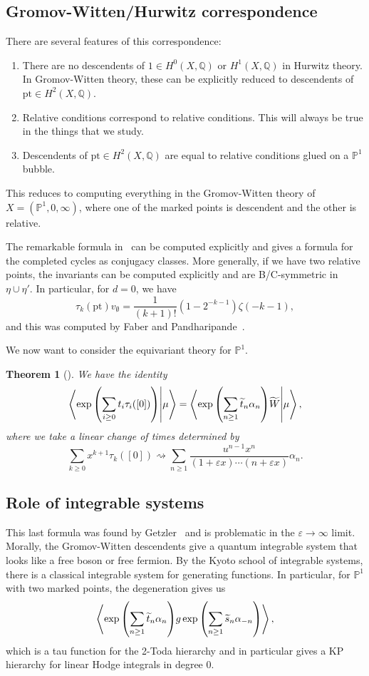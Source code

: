 \documentclass[leqno, openany]{memoir}
\newtheorem{thm}{Theorem}[section]
\theoremstyle{definition}
\theoremstyle{remark}
\theoremstyle{plain}
\theoremstyle{definition}
\theoremstyle{remark}
\newcommand{\Q}{\mathbb{Q}}
\renewcommand{\P}{\mathbb{P}}
\newcommand{\ep}{\varepsilon}
\newcommand{\mr}[1]{\mathrm{#1}}
\newcommand{\wt}[1]{\widetilde{#1}}
\begin{document}
\subsection{Gromov-Witten/Hurwitz correspondence}

There are several features of this correspondence:
\begin{enumerate}
    \item There are no descendents of $1 \in H^0(X, \Q)$ or $H^1(X, \Q)$ in Hurwitz theory. In Gromov-Witten theory, these can be explicitly reduced to descendents of $\mr{pt} \in H^2(X, \Q)$.
    \item Relative conditions correspond to relative conditions. This will always be true in the things that we study.
    \item Descendents of $\mr{pt} \in H^2(X, \Q)$ are equal to relative conditions glued on a $\P^1$ bubble.
\end{enumerate}
This reduces to computing everything in the Gromov-Witten theory of $X = (\P^1, 0, \infty)$, where one of the marked points is descendent and the other is relative.

The remarkable formula in~ can be computed explicitly and gives a formula for the completed cycles as conjugacy classes. More generally, if we have two relative points, the invariants can be computed explicitly and are B/C-symmetric in $\eta \cup \eta'$. In particular, for $d = 0$, we have
\[ \tau_k(\mr{pt}) v_{\emptyset} = \frac{1}{(k+1)!}(1-2^{-k-1}) \zeta(-k-1), \]
and this was computed by Faber and Pandharipande~\cite{gwhodge}.

We now want to consider the equivariant theory for $\P^1$.
\begin{thm}[\cite{op2}]\label{thm:op02}
    We have the identity
    \[ \braket{\exp\qty(\sum_{i \geq 0} t_i \tau_i([0]))}{\mu} = \braket{\exp\qty(\sum_{n \geq 1} \wt{t}_n \alpha_n) \wt{W}}{\mu}, \]
    where we take a linear change of times determined by
    \[ \sum_{k \geq 0} x^{k+1} \tau_k([0]) \rightsquigarrow \sum_{n \geq 1} \frac{u^{n-1}x^n}{(1+\ep x) \cdots (n+\ep x)} \alpha_n. \]
\end{thm}

\subsection{Role of integrable systems}

This last formula was found by Getzler~\cite{getz} and is problematic in the $\ep \to \infty$ limit. Morally, the Gromov-Witten descendents give a quantum integrable system that looks like a free boson or free fermion. By the Kyoto school of integrable systems, there is a classical integrable system for generating functions. In particular, for $\P^1$ with two marked points, the degeneration gives us
\[ \ev{\exp \qty(\sum_{n \geq 1} \wt{t}_n \alpha_n) g \exp\qty(\sum_{n \geq 1} \wt{s}_n \alpha_{-n})}, \]
which is a tau function for the 2-Toda hierarchy and in particular gives a KP hierarchy for linear Hodge integrals in degree $0$.
\end{document}
